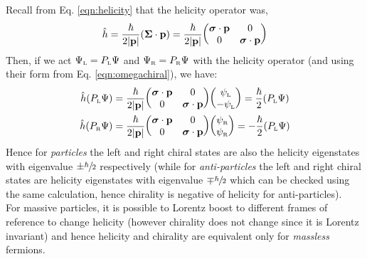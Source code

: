 Recall from Eq. \ref{eqn:helicity} that the helicity operator was,
\begin{align*}
    \hat{h}= \frac{\hbar}{2|\vb{p}|}( \bs{\Sigma}\cdot \vb{p}) =\frac{\hbar}{2|\vb{p}|} \mqty(\bs{\sigma}\cdot \vb{p} & 0 \\ 0 &\bs{\sigma}\cdot \vb{p})
\end{align*}
Then, if we act $\Psi_\text{\tiny L} = P_\text{\tiny L}\Psi$ and $\Psi_\text{\tiny R} = P_\text{\tiny R}\Psi$ with the helicity operator (and using their form from Eq. \ref{eqn:omegachiral}), we have:
\begin{align*}
    \hat{h}(P_\text{\tiny L}\Psi )&= \frac{\hbar}{2|\vb{p}|} \mqty(\bs{\sigma}\cdot \vb{p} & 0 \\ 0 &\bs{\sigma}\cdot \vb{p}) \mqty(\psi_{\text{\tiny L}}\\ -\psi_{\text{\tiny L}} ) = \frac{\hbar}{2}(P_\text{\tiny L}\Psi )\\
     \hat{h}(P_\text{\tiny R}\Psi )&= \frac{\hbar}{2|\vb{p}|} \mqty(\bs{\sigma}\cdot \vb{p} & 0 \\ 0 &\bs{\sigma}\cdot \vb{p}) \mqty(\psi_{\text{\tiny R}}\\ \psi_{\text{\tiny R}}) = -\frac{\hbar}{2}(P_\text{\tiny L}\Psi )
\end{align*}
Hence for \textit{particles} the left and right chiral states are also the helicity eigenstates with eigenvalue $\pm \sfrac{\hbar}{2}$ respectively (while for \textit{anti-particles} the left and right chiral states are helicity eigenstates with eigenvalue $\mp \sfrac{\hbar}{2}$ which can be checked using the same calculation, hence chirality is negative of helicity for anti-particles). \\[0.2cm]
For massive particles, it is possible to Lorentz boost to different frames of reference to change helicity (however chirality does not change since it is Lorentz invariant) and hence helicity and chirality are equivalent only for \textit{massless} fermions. 